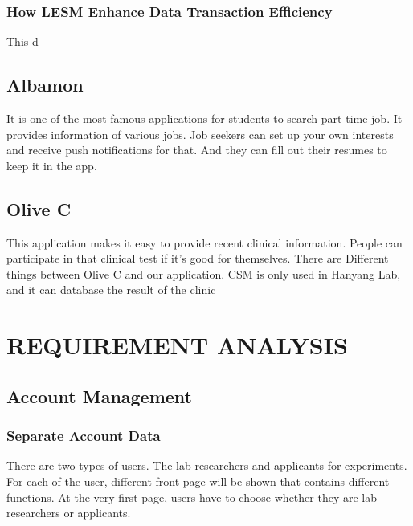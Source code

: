\documentclass[letterpaper, 10 pt, conference]{ieeeconf}  %
\begin{document}
\subsubsection{How LESM Enhance Data Transaction Efficiency}
This d






\subsection{Albamon}

It is one of the most famous applications for students to search part-time job. It provides information of various jobs. Job seekers can set up your own interests and receive push notifications for that. And they can fill out their resumes to keep it in the app.

\subsection{Olive C}
This application makes it easy to provide recent clinical information. People can participate in that clinical test if it’s good for themselves. There are Different things between Olive C and our application. CSM  is only used in Hanyang Lab, and it can database the result of the clinic




\section{REQUIREMENT ANALYSIS\\}


\subsection{Account Management}
\subsubsection{Separate Account Data}
There are two types of users. The lab researchers and applicants for experiments. For each of the user, different front page will be shown that contains different functions. At the very first page, users have to choose whether they are lab researchers or applicants. 
\end{document}
